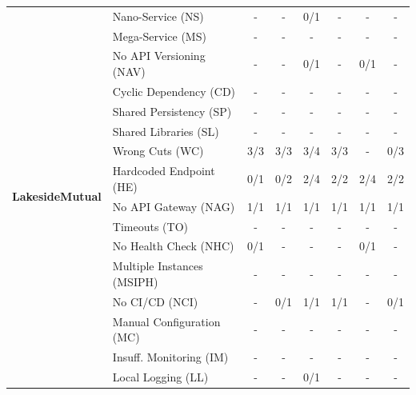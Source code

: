 \begin{table}[H]
\begin{tabular}{| c | l | c c | c c | c c |}
        \multirow{16}{*}{\textbf{LakesideMutual}} 
        & Nano-Service (NS)           & - & - & 0/1 & - & - & - \\
        & Mega-Service (MS)           & - & - & - & - & - & - \\
        & No API Versioning (NAV)     & - & - & 0/1 & - & 0/1 & - \\
        & Cyclic Dependency (CD)      & - & - & - & - & - & - \\
        & Shared Persistency (SP)     & - & - & - & - & - & - \\
        & Shared Libraries (SL)       & - & - & - & - & - & - \\
        & Wrong Cuts (WC)             & 3/3 & 3/3 & 3/4 & 3/3 & - & 0/3 \\
        & Hardcoded Endpoint (HE)     & 0/1 & 0/2 & 2/4 & 2/2 & 2/4 & 2/2 \\
        & No API Gateway (NAG)        & 1/1 & 1/1 & 1/1 & 1/1 & 1/1 & 1/1 \\
        & Timeouts (TO)               & - & - & - & - & - & - \\
        & No Health Check (NHC)       & 0/1 & - & - & - & 0/1 & - \\
        & Multiple Instances (MSIPH)  & - & - & - & - & - & - \\
        & No CI/CD (NCI)              & - & 0/1 & 1/1 & 1/1 & - & 0/1 \\
        & Manual Configuration (MC)   & - & - & - & - & - & - \\
        & Insuff. Monitoring (IM)     & - & - & - & - & - & - \\
        & Local Logging (LL)          & - & - & 0/1 & - & - & - \\ \hline
        

\end{tabular}
\end{table}
